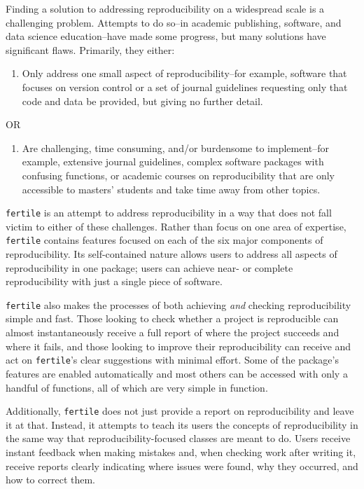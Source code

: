 \documentclass[12pt,twoside]{reedthesis}
\providecommand{\tightlist}{%
  \setlength{\itemsep}{0pt}\setlength{\parskip}{0pt}}
\begin{document}
Finding a solution to addressing reproducibility on a widespread scale is a challenging problem. Attempts to do so--in academic publishing, software, and data science education--have made some progress, but many solutions have significant flaws. Primarily, they either:
\begin{enumerate}
\def\labelenumi{\Alph{enumi})}
\tightlist
\item
  Only address one small aspect of reproducibility--for example, software that focuses on version control or a set of journal guidelines requesting only that code and data be provided, but giving no further detail.
\end{enumerate}
\begin{center}
OR
\end{center}
\begin{enumerate}
\def\labelenumi{\Alph{enumi})}
\setcounter{enumi}{1}
\tightlist
\item
  Are challenging, time consuming, and/or burdensome to implement--for example, extensive journal guidelines, complex software packages with confusing functions, or academic courses on reproducibility that are only accessible to masters' students and take time away from other topics.
\end{enumerate}
\texttt{fertile} is an attempt to address reproducibility in a way that does not fall victim to either of these challenges. Rather than focus on one area of expertise, \texttt{fertile} contains features focused on each of the six major components of reproducibility. Its self-contained nature allows users to address all aspects of reproducibility in one package; users can achieve near- or complete reproducibility with just a single piece of software.

\texttt{fertile} also makes the processes of both achieving \emph{and} checking reproducibility simple and fast. Those looking to check whether a project is reproducible can almost instantaneously receive a full report of where the project succeeds and where it fails, and those looking to improve their reproducibility can receive and act on \texttt{fertile}'s clear suggestions with minimal effort. Some of the package's features are enabled automatically and most others can be accessed with only a handful of functions, all of which are very simple in function.

Additionally, \texttt{fertile} does not just provide a report on reproducibility and leave it at that. Instead, it attempts to teach its users the concepts of reproducibility in the same way that reproducibility-focused classes are meant to do. Users receive instant feedback when making mistakes and, when checking work after writing it, receive reports clearly indicating where issues were found, why they occurred, and how to correct them.
\end{document}
